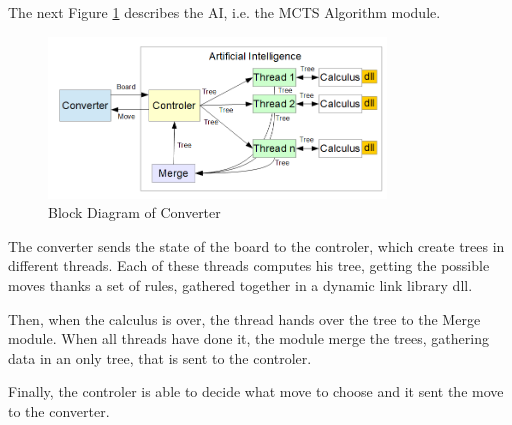 The next Figure \ref{fig:flow} describes the AI, i.e. the MCTS Algorithm module.

\begin{figure}[H]
	\centering
	\includegraphics[width=0.80\textwidth]{2General_Architecture/2.3MCTS/AI.png}
	\caption{Block Diagram of Converter}
	\label{fig:flow}
\end{figure}

The converter sends the state of the board to the controler, which create trees in different threads. Each of these threads computes his tree, getting the possible moves thanks a set of rules, gathered together in a dynamic link library dll. 

Then, when the calculus is over, the thread hands over the tree to the Merge module. When all threads have done it, the module merge the trees, gathering data in an only tree, that is sent to the controler.

Finally, the controler is able to decide what move to choose and it sent the move to the converter.

